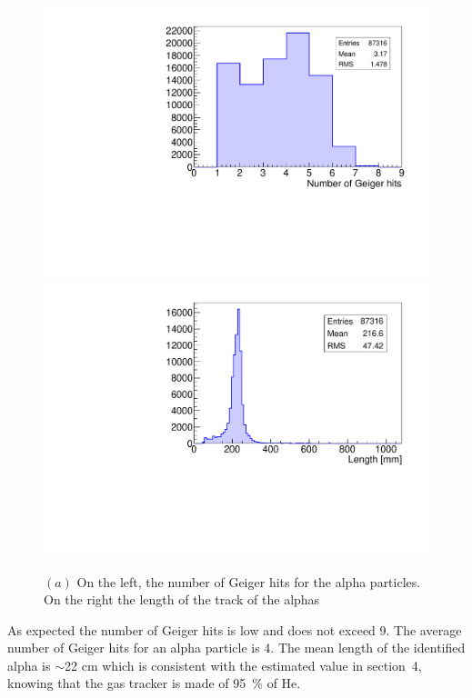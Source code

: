 \documentclass[main.tex]{subfiles}
\begin{document}
\begin{figure}[h!]
\begin{center}
\includegraphics[scale=0.33]{pictures/Chap5/source_selection_surface_gghits_alpha.pdf}
\includegraphics[scale=0.33]{pictures/Chap5/source_selection_surface_length_alpha.pdf}


\caption{$(a)$ On the left, the number of Geiger hits for the alpha particles. On the right the length of the track of the alphas}
\label{alphaLengthSSS}
\end{center}
\end{figure}


\noindent As expected the number of Geiger hits is low and does not exceed 9. The average number of Geiger hits for an alpha particle is 4. The mean length of the identified alpha is $\sim$22 cm which is consistent with the estimated value in section~4, knowing that the gas tracker is made of 95~\% of He.  
\end{document}
